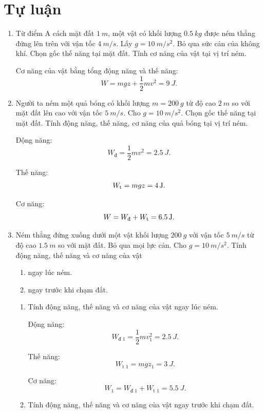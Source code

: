 \section{Tự luận}
\begin{enumerate}[label=\bfseries Câu \arabic*:]

	\item {}
	
	
	{
		Từ điểm A cách mặt đất $\SI{1}{m}$, một vật có khối lượng $\SI{0.5}{kg}$ được ném thẳng đứng lên trên với vận tốc $\SI{4}{m/s}$. Lấy $g=\SI{10}{m/s^2}$. Bỏ qua sức cản của không khí. Chọn gốc thế năng tại mặt đất. Tính cơ năng của vật tại vị trí ném.
	}
	
	\hideall
	{	
		Cơ năng của vật bằng tổng động năng và thế năng:
		$$W=mgz+\dfrac{1}{2}mv^2 = \SI{9}{J}.$$
	}
	\item {}
	
	
	{
		Người ta ném một quả bóng có khối lượng $m=\SI{200}{g}$ từ độ cao $\SI{2}{m}$ so với mặt đất lên cao với vận tốc $\SI{5}{m/s}$. Cho $g=\SI{10}{m/s^2}$. Chọn gốc thế năng tại mặt đất. Tính động năng, thế năng, cơ năng của quả bóng tại vị trí ném.
	}
	
	\hideall
	{	
		Động năng:
		$$W_\text{đ} = \dfrac{1}{2}mv^2 = \SI{2.5}{J}.$$
		
		Thế năng:
		$$W_\text t = mgz = \SI{4}{J}.$$
		
		Cơ năng:
		$$W=W_\text{đ} + W_\text t = \SI{6.5}{J}.$$
	}
	\item {}
	
	
	{
		Ném thẳng đứng xuống dưới một vật khối lượng $\SI{200}{g}$ với vận tốc $\SI{5}{m/s}$ từ độ cao $\SI{1.5}{m}$ so với mặt đất. Bỏ qua mọi lực cản. Cho $g=\SI{10}{m/s^2}$. Tính động năng, thế năng và cơ năng của vật
		\begin{enumerate}[label=\alph*)]
			\item ngay lúc ném.
			\item ngay trước khi chạm đất.
		\end{enumerate}
	}
	
	\hideall
	{	
		\begin{enumerate}[label=\alph*)]
			\item Tính động năng, thế năng và cơ năng của vật ngay lúc ném.
			
			Động năng:
			$$W_\text{đ 1} = \dfrac{1}{2}mv_1^2 = \SI{2.5}{J}.$$
			
			Thế năng:
			$$W_\text{t 1} = mgz_1 = \SI{3}{J}.$$
			
			Cơ năng:
			$$W_1 = W_\text{đ 1} + W_\text{t 1} = \SI{5.5}{J}.$$
			\item Tính động năng, thế năng và cơ năng của vật ngay trước khi chạm đất.
			

\end{enumerate}}
\end{enumerate}
